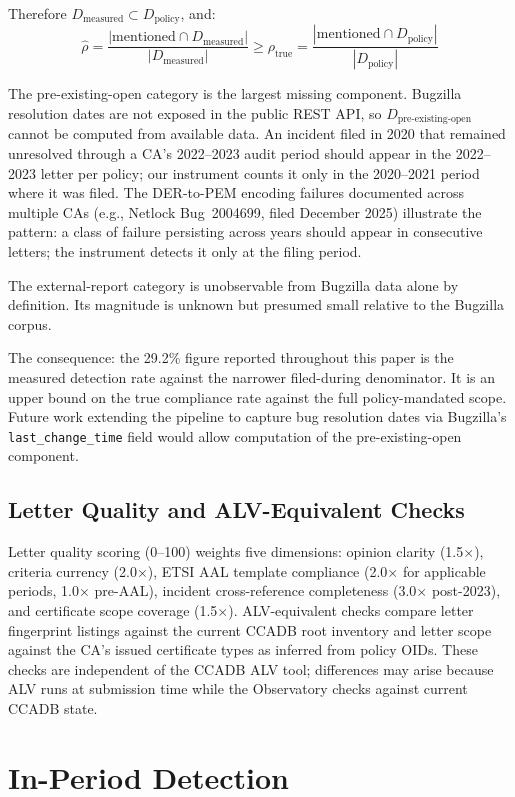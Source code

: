 \documentclass[10pt,twocolumn,letterpaper]{article}
\begin{document}
Therefore $D_\text{measured} \subset D_\text{policy}$, and:
\[
\hat{\rho} = \frac{|\text{mentioned} \cap D_\text{measured}|}{|D_\text{measured}|} \geq \rho_\text{true} = \frac{|\text{mentioned} \cap D_\text{policy}|}{|D_\text{policy}|}
\]

The pre-existing-open category is the largest missing component.
Bugzilla resolution dates are not exposed in the public REST API, so
$D_\text{pre-existing-open}$ cannot be computed from available data.
An incident filed in 2020 that remained unresolved through a CA's
2022--2023 audit period should appear in the 2022--2023 letter per
policy; our instrument counts it only in the 2020--2021 period where
it was filed. The DER-to-PEM encoding failures documented across
multiple CAs (e.g., Netlock Bug~2004699, filed December 2025) illustrate
the pattern: a class of failure persisting across years should appear
in consecutive letters; the instrument detects it only at the filing
period.

The external-report category is unobservable from Bugzilla data alone
by definition. Its magnitude is unknown but presumed small relative to
the Bugzilla corpus.

The consequence: the 29.2\% figure reported throughout this paper is
the measured detection rate against the narrower filed-during denominator.
It is an upper bound on the true compliance rate against the full
policy-mandated scope. Future work extending the pipeline to capture
bug resolution dates via Bugzilla's \texttt{last\_change\_time} field
would allow computation of the pre-existing-open component.

\subsection{Letter Quality and ALV-Equivalent Checks}
Letter quality scoring (0--100) weights five dimensions: opinion clarity
(1.5$\times$), criteria currency (2.0$\times$), ETSI AAL template
compliance (2.0$\times$ for applicable periods, 1.0$\times$ pre-AAL),
incident cross-reference completeness (3.0$\times$ post-2023), and
certificate scope coverage (1.5$\times$). ALV-equivalent checks compare
letter fingerprint listings against the current CCADB root inventory and
letter scope against the CA's issued certificate types as inferred from
policy OIDs. These checks are independent of the CCADB ALV tool;
differences may arise because ALV runs at submission time while the
Observatory checks against current CCADB state.

\section{In-Period Detection}
\label{sec:detection}
\end{document}
